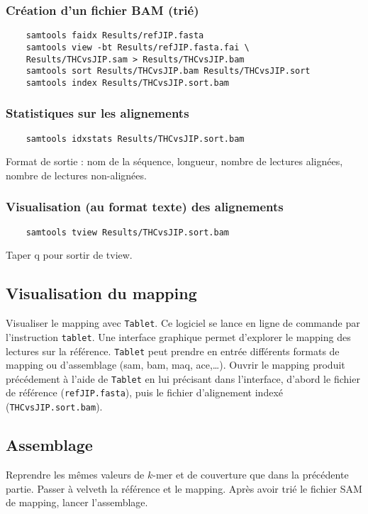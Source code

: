 \documentclass[a4paper,12pt]{article}
\begin{document}
\subsubsection*{Création d'un fichier BAM (trié)}
\begin{lstlisting}
	samtools faidx Results/refJIP.fasta
	samtools view -bt Results/refJIP.fasta.fai \
	Results/THCvsJIP.sam > Results/THCvsJIP.bam
	samtools sort Results/THCvsJIP.bam Results/THCvsJIP.sort
	samtools index Results/THCvsJIP.sort.bam
\end{lstlisting}

\subsubsection*{Statistiques sur les alignements}
\begin{lstlisting}
	samtools idxstats Results/THCvsJIP.sort.bam
\end{lstlisting}
Format de sortie : nom de la séquence, longueur, nombre de lectures alignées, nombre de lectures non-alignées.

\subsubsection*{Visualisation (au format texte) des alignements}
\begin{lstlisting}
	samtools tview Results/THCvsJIP.sort.bam
\end{lstlisting}
Taper q pour sortir de tview.



\subsection{Visualisation du mapping}
Visualiser le mapping avec \verb=Tablet=. Ce logiciel se lance en ligne de commande par l'instruction \verb=tablet=. Une interface graphique permet d'explorer le mapping des lectures sur la référence. \verb=Tablet= peut prendre en entrée différents formats de mapping ou d'assemblage (sam, bam, maq, ace,\ldots). Ouvrir le mapping produit précédement à l'aide de \verb=Tablet= en lui précisant dans l'interface, d'abord le fichier de référence (\verb=refJIP.fasta=), puis le fichier d'alignement indexé (\verb=THCvsJIP.sort.bam=).

\subsection{Assemblage}
Reprendre les mêmes valeurs de $k$-mer et de couverture que dans la précédente partie. Passer à velveth la référence et le mapping. Après avoir trié le fichier SAM de mapping, lancer l'assemblage.
\end{document}
